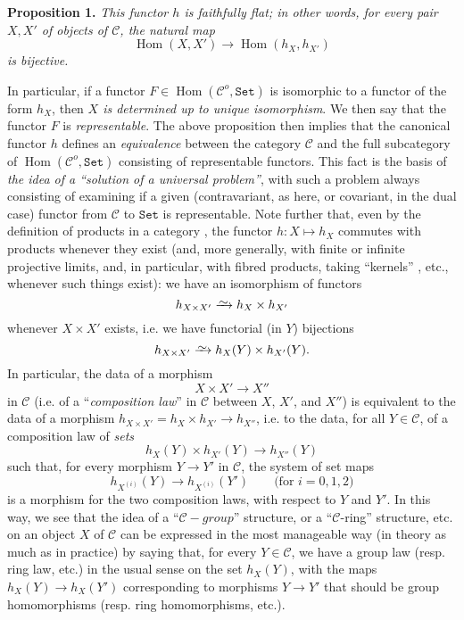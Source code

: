 \documentclass{article}
\newenvironment{itenv}[1]
  {\phantomsection\par\medskip\noindent\textbf{#1.}\itshape}
  {\par\medskip}
\renewcommand{\cal}[1]{{\mathcal{#1}}}
\newcommand{\simto}{\xrightarrow{\raisebox{-0.7ex}[0ex][0ex]{$\sim$}}}
\newcommand{\Set}{\mathtt{Set}}
\DeclareMathOperator{\Hom}{Hom}
\newcommand{\oldpage}[1]{\marginpar{\footnotesize$\Big\vert$ \textit{p.~#1}}}
\begin{document}
\begin{itenv}{Proposition 1}
\label{A.1-proposition1}
  This functor $h$ is \emph{faithfully flat};
  in other words, for every pair $X,X'$ of objects of $\cal{C}$, the natural map
  \[
    \Hom(X,X') \to \Hom(h_X,h_{X'})
  \]
  is \emph{bijective}.
\end{itenv}

In particular, if a functor $F\in\Hom(\cal{C}^o,\Set)$ is isomorphic to a functor of the form $h_X$, then \emph{$X$ is determined up to unique isomorphism}.
We then say that the functor $F$ is \emph{representable}.
The above proposition then implies that the canonical functor $h$ defines an \emph{equivalence} between the category $\cal{C}$ and the full subcategory of $\Hom(\cal{C}^o,\Set)$ consisting of representable functors.
This fact is the basis of \emph{the idea of a ``solution of a universal problem''}, with such a problem always consisting of examining if a given (contravariant, as here, or covariant, in the dual case) functor from $\cal{C}$ to $\Set$ is representable.
\oldpage{195-02}
Note further that, even by the definition of products in a category \cite{1}, the functor $h\colon X\mapsto h_X$ commutes with products whenever they exist (and, more generally, with finite or infinite projective limits, and, in particular, with fibred products, taking ``kernels'' \cite{2}, etc., whenever such things exist): we have an isomorphism of functors
\[
  h_{X\times X'} \simto h_X\times h_{X'}
\]
whenever $X\times X'$ exists, i.e. we have functorial (in $Y$) bijections
\[
  h_{X\times X'} \simto h_X(Y)\times h_{X'}(Y).
\]
In particular, the data of a morphism
\[
  X\times X' \to X''
\]
in $\cal{C}$ (i.e. of a ``\emph{composition law}'' in $\cal{C}$ between $X$, $X'$, and $X''$) is equivalent to the data of a morphism $h_{X\times X'}=h_X\times h_{X'}\to h_{X''}$, i.e. to the data, for all $Y\in\cal{C}$, of a composition law of \emph{sets}
\[
  h_X(Y)\times h_{X'}(Y) \to h_{X''}(Y)
\]
such that, for every morphism $Y\to Y'$ in $\cal{C}$, the system of set maps
\[
  h_{X^{(i)}}(Y) \to h_{X^{(i)}}(Y')
  \qquad\mbox{(for $i=0,1,2$)}
\]
is a morphism for the two composition laws, with respect to $Y$ and $Y'$.
In this way, we see that the idea of a ``$\cal{C}-group$'' structure, or a ``$\cal{C}$-ring'' structure, etc. on an object $X$ of $\cal{C}$ can be expressed in the most manageable way (in theory as much as in practice) by saying that, for every $Y\in\cal{C}$, we have a group law (resp. ring law, etc.) in the usual sense on the set $h_X(Y)$, with the maps $h_X(Y)\to h_X(Y')$ corresponding to morphisms $Y\to Y'$ that should be group homomorphisms (resp. ring homomorphisms, etc.).
\end{document}
